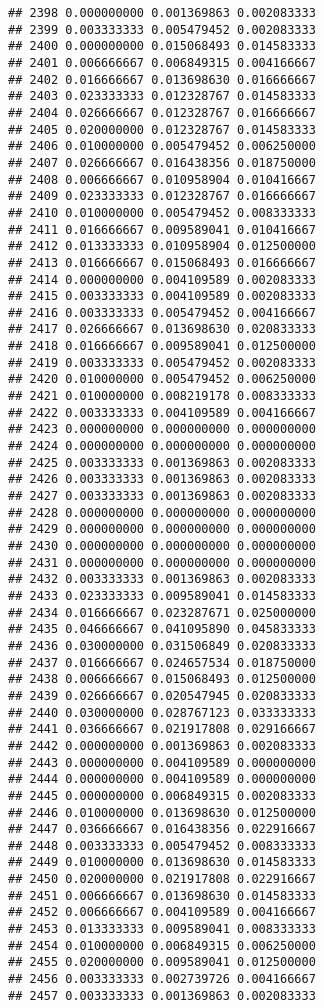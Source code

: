 \documentclass[
]{article}
\begin{document}
\begin{verbatim}
## 2398 0.000000000 0.001369863 0.002083333
## 2399 0.003333333 0.005479452 0.002083333
## 2400 0.000000000 0.015068493 0.014583333
## 2401 0.006666667 0.006849315 0.004166667
## 2402 0.016666667 0.013698630 0.016666667
## 2403 0.023333333 0.012328767 0.014583333
## 2404 0.026666667 0.012328767 0.016666667
## 2405 0.020000000 0.012328767 0.014583333
## 2406 0.010000000 0.005479452 0.006250000
## 2407 0.026666667 0.016438356 0.018750000
## 2408 0.006666667 0.010958904 0.010416667
## 2409 0.023333333 0.012328767 0.016666667
## 2410 0.010000000 0.005479452 0.008333333
## 2411 0.016666667 0.009589041 0.010416667
## 2412 0.013333333 0.010958904 0.012500000
## 2413 0.016666667 0.015068493 0.016666667
## 2414 0.000000000 0.004109589 0.002083333
## 2415 0.003333333 0.004109589 0.002083333
## 2416 0.003333333 0.005479452 0.004166667
## 2417 0.026666667 0.013698630 0.020833333
## 2418 0.016666667 0.009589041 0.012500000
## 2419 0.003333333 0.005479452 0.002083333
## 2420 0.010000000 0.005479452 0.006250000
## 2421 0.010000000 0.008219178 0.008333333
## 2422 0.003333333 0.004109589 0.004166667
## 2423 0.000000000 0.000000000 0.000000000
## 2424 0.000000000 0.000000000 0.000000000
## 2425 0.003333333 0.001369863 0.002083333
## 2426 0.003333333 0.001369863 0.002083333
## 2427 0.003333333 0.001369863 0.002083333
## 2428 0.000000000 0.000000000 0.000000000
## 2429 0.000000000 0.000000000 0.000000000
## 2430 0.000000000 0.000000000 0.000000000
## 2431 0.000000000 0.000000000 0.000000000
## 2432 0.003333333 0.001369863 0.002083333
## 2433 0.023333333 0.009589041 0.014583333
## 2434 0.016666667 0.023287671 0.025000000
## 2435 0.046666667 0.041095890 0.045833333
## 2436 0.030000000 0.031506849 0.020833333
## 2437 0.016666667 0.024657534 0.018750000
## 2438 0.006666667 0.015068493 0.012500000
## 2439 0.026666667 0.020547945 0.020833333
## 2440 0.030000000 0.028767123 0.033333333
## 2441 0.036666667 0.021917808 0.029166667
## 2442 0.000000000 0.001369863 0.002083333
## 2443 0.000000000 0.004109589 0.000000000
## 2444 0.000000000 0.004109589 0.000000000
## 2445 0.000000000 0.006849315 0.002083333
## 2446 0.010000000 0.013698630 0.012500000
## 2447 0.036666667 0.016438356 0.022916667
## 2448 0.003333333 0.005479452 0.008333333
## 2449 0.010000000 0.013698630 0.014583333
## 2450 0.020000000 0.021917808 0.022916667
## 2451 0.006666667 0.013698630 0.014583333
## 2452 0.006666667 0.004109589 0.004166667
## 2453 0.013333333 0.009589041 0.008333333
## 2454 0.010000000 0.006849315 0.006250000
## 2455 0.020000000 0.009589041 0.012500000
## 2456 0.003333333 0.002739726 0.004166667
## 2457 0.003333333 0.001369863 0.002083333

\end{verbatim}
\end{document}
